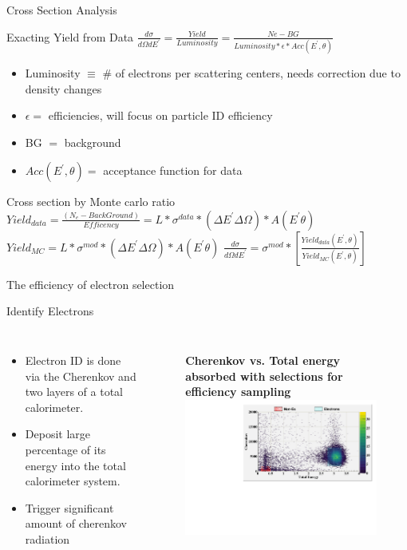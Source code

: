 \documentclass{beamer}
\begin{document}
\begin{frame}{Cross Section Analysis}
	\begin{block}{Exacting Yield from Data}
		\centering
		$\frac{d\sigma}{d\Omega dE^\prime} =  \frac{Yield}{Luminosity} = \frac{Ne - BG }{Luminosity *  \epsilon * Acc(E^\prime ,\theta)} $
		\begin{itemize}
			\item Luminosity $\equiv$ \# of electrons per scattering centers, needs correction due to density changes
			\item $\epsilon = $ efficiencies, will focus on particle ID efficiency 
			\item  BG $ = $ background
			\item $Acc(E^\prime ,\theta) =$ acceptance function for data
		\end{itemize}
	\end{block}	
	\begin{block}{Cross section by Monte carlo ratio}	
		$ Yield_{data} = \frac{\left(N_e - BackGround\right)}{Efficency } =  \textit{L} *\sigma^{data} * \left( \Delta E^\prime \Delta \Omega\right)*  A \left(E^\prime \theta \right)$
		$ Yield_{MC} = \textit{L} *\sigma^{mod} * \left( \Delta E^\prime \Delta \Omega\right)*  A \left(E^\prime \theta \right)$
		\centering $ \frac{d\sigma}{d\Omega dE^\prime} = \sigma^{mod} * \left[\frac{Yield_{data} \left( 
			E^\prime,\theta\right)} {Yield_{MC}\left(E^\prime,\theta\right)}\right] $
	\end{block}	
\end{frame}
\begin{frame}{The efficiency of electron selection}
	\begin{block}{Identify Electrons}
		\begin{columns}
			\begin{itemize}
 		 		\setlength{\parskip}{0pt}
				\setlength{\itemsep}{0pt plus 1pt}
				\item Electron ID is done via the Cherenkov and two layers of a total calorimeter.
				\item Deposit large percentage of its energy into the total calorimeter system.
				\item Trigger significant amount of cherenkov radiation
			\end{itemize}		
			\begin{figure}
					\textbf{Cherenkov vs. Total energy absorbed with selections for efficiency sampling }
					\includegraphics[width=7.0cm]{../images/PID_2d.pdf}
			\end{figure}
		\end{columns}
	\end{block}
\end{frame}
\end{document}
